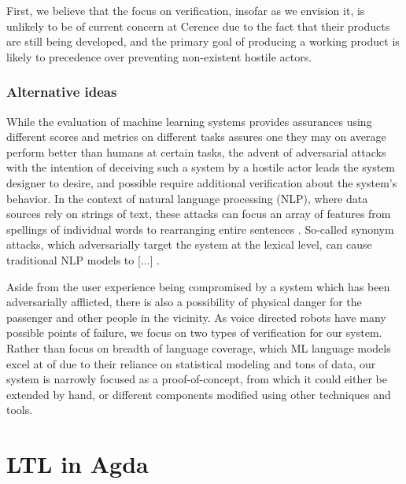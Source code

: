 \documentclass{article}
\begin{document}
First, we believe that the focus on verification, insofar as we envision it, is
unlikely to be of current concern at Cerence due to the fact that their products
are still being developed, and the primary goal of producing a working product
is likely to precedence over preventing non-existent hostile actors.

\subsubsection{Alternative ideas}

While the evaluation of machine learning systems provides assurances using
different scores and metrics on different tasks assures one they may on average
perform better than humans at certain tasks, the advent of adversarial attacks
\cite{szegedy} with the intention of deceiving such a system by a hostile actor
leads the system designer to desire, and possible require additional
verification about the system's behavior. In the context of natural language
processing (NLP), where data sources rely on strings of text, these attacks can
focus an array of features from spellings of individual words to rearranging
entire sentences \cite{}. So-called synonym attacks, which adversarially target
the system at the lexical level, can cause traditional NLP models to [...]
\cite{}.


Aside from the user experience being compromised by a system which has been
adversarially afflicted, there is also a possibility of physical danger for the
passenger and other people in the vicinity. As voice directed robots have many
possible points of failure, we focus on two types of verification for our
system. Rather than focus on breadth of language coverage, which ML language
models excel at of due to their reliance on statistical modeling and tons
of data, our system is narrowly focused as a proof-of-concept, from which it
could either be extended by hand, or different components modified using
other techniques and tools.





\section{LTL in Agda}
\end{document}
